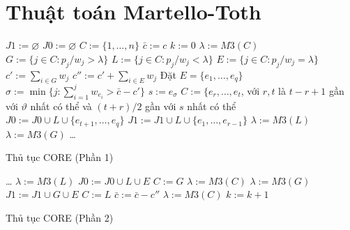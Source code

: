 \section{Thuật toán Martello-Toth}


\begin{algorithm}[H]
    \DontPrintSemicolon
    \vspace{1em}
    \vspace{1em}
    $J1 := \varnothing$\;
    $J0 := \varnothing$\;
    $C := \{1, \dots, n\}$\;
    $\bar{c} := c$\;
    $k:=0$\;
    $\lambda := M3(C)$\;
    {
        $G:= \{j \in C: p_j / w_j > \lambda\}$\;
        $L:=\{j\in C: p_j/w_j < \lambda\}$\;
        $E:=\{j\in C: p_j/w_j = \lambda\}$\;
        $c' := \sum_{i \in G}w_j$
        $c'' := c' + \sum_{i \in E}w_j$\;
        {
            {
                Đặt $E = \{e_1, \dots, e_q\}$\;
                $\sigma := \min\{j : \sum_{i=1}^jw_{e_i} > \bar{c} - c'\}$\;
                $s := e_\sigma$\;
                $C:= \{e_r, \dots, e_t$, với $r, t$ là $t - r + 1$ gần với $\vartheta$ nhất có thể và $(t+r)/ 2$ gần với $s$ nhất có thể\;
                $J0 := J0 \cup L \cup \{e_{t+1}, \dots, e_q\}$\;
                $J1 := J1 \cup L \cup \{e_{1}, \dots, e_{r- 1}\}$\;
            }
            \Else
            {
                {
                    $\lambda := M3(L)$\;
                }
                \Else
                {
                    $\lambda := M3(G)$\;
                }
            }
        }    
    \dots}
    \caption{Thủ tục CORE (Phần 1)}
    \label{algo:core_part1}
\end{algorithm}


\begin{algorithm}[H]
    \dots
    {\Else
        {
            {
                {
                    $\lambda := M3(L)$\;
                }
                \Else
                {
                    $J0 := J0 \cup L \cup E$\;
                    $C:=G$\;
                    $\lambda := M3(C)$\;
                }
            }
            \Else
            {
                {
                    $\lambda := M3(G)$\;
                }
                \Else
                {
                    $J1 := J1 \cup G \cup E$\;
                    $C:=L$\;
                    $\bar{c} := \bar{c} - c''$\;
                    $\lambda := M3(C)$\;
                }
            }
        }
        $k:=k+1$
    }
    \caption{Thủ tục CORE (Phần 2)}
    \label{algo:core_part2}
\end{algorithm}


